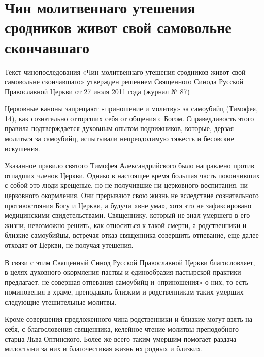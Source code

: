 \mychapterending

\label{chap:Uteshenie-srodnikam-samoubiits}

\section{Чин молитвеннаго утешения сродников живот свой самовольне скончавшаго}\begin{mymulticols}


{\small Текст чинопоследования «Чин молитвеннаго утешения сродников живот свой самовольне скончавшаго» утвержден решением Священного Синода Русской Православной Церкви от 27 июля 2011 года (журнал № 87)

Церковные каноны запрещают «приношение и молитву» за самоубийц (Тимофея, 14), как сознательно отторгших себя от общения с Богом. Справедливость этого правила подтверждается духовным опытом подвижников, которые, дерзая молиться за самоубийц, испытывали непреодолимую тяжесть и бесовские искушения.

Указанное правило святого Тимофея Александрийского было направлено против отпадших членов Церкви. Однако в настоящее время большая часть покончивших с собой это люди крещеные, но не получившие ни церковного воспитания, ни церковного окормления. Они прерывают свою жизнь не вследствие сознательного противостояния Богу и Церкви, а будучи «вне ума», хотя это не зафиксировано медицинскими свидетельствами. Священнику, который не знал умершего в его жизни, невозможно решить, как относиться к такой смерти, а родственники и близкие самоубийцы, встречая отказ священника совершить отпевание, еще далее отходят от Церкви, не получая утешения.

В связи с этим Священный Синод Русской Православной Церкви благословляет, в целях духовного окормления паствы и единообразия пастырской практики предлагает, не совершая отпевания самоубийц и «приношения» о них, то есть поминовения в храме, преподавать близким и родственникам таких умерших следующие утешительные молитвы.

Кроме совершения предложенного чина родственники и близкие могут взять на себя, с благословения священника, келейное чтение молитвы преподобного старца Льва Оптинского. Более же всего таким умершим помогает раздача милостыни за них и благочестивая жизнь их родных и близких.}


\end{mymulticols}
